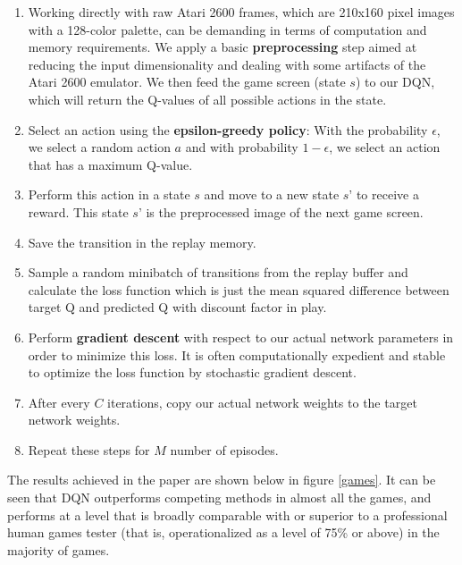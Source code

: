 \documentclass{article}
\begin{document}
\begin{enumerate}
\item Working directly with raw Atari 2600 frames, which are 210x160
pixel images with a 128-color palette, can be demanding in terms of computation
and memory requirements. We apply a basic \textbf{preprocessing} step aimed at reducing
the input dimensionality and dealing with some artifacts of the Atari 2600 emulator. We then feed the game screen (state $s$) to our DQN, which will return the Q-values of all possible actions in the state.

\item Select an action using the \textbf{epsilon-greedy policy}: With the probability $\epsilon$, we select a random action $a$ and with probability $1-\epsilon$, we select an action that has a maximum Q-value.

\item Perform this action in a state $s$ and move to a new state $s’$ to receive a reward. This state $s’$ is the preprocessed image of the next game screen.

\item Save the transition in the replay memory.

\item Sample a random minibatch of transitions from the replay buffer and calculate the loss function which is just the mean squared difference between target Q and predicted Q with discount factor in play.

\item Perform \textbf{gradient descent} with respect to our actual network parameters in order to minimize this loss. It is often computationally expedient and stable to optimize the loss function by stochastic gradient descent.

\item After every $C$ iterations, copy our actual network weights to the target network weights.

\item Repeat these steps for $M$ number of episodes.

\end{enumerate}

The results achieved in the paper are shown below in figure \ref{games}. It can be seen that DQN
outperforms competing methods in almost all the games, and performs at a level that is broadly
comparable with or superior to a professional human games tester (that is, operationalized as a level
of 75\% or above) in the majority of games.
\end{document}
